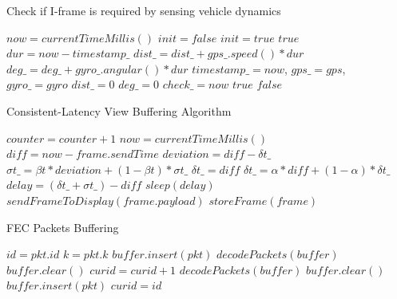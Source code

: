 
\begin{algorithm}[ht]
 \caption{Check if I-frame is required by sensing vehicle dynamics}
	\label{contextaware}
    \begin{algorithmic}[1]
  \State $now = currentTimeMillis()$
  \State $init = false$
    \State $init = true$
    \Return $true$
  \Else
    \State $dur = now - timestamp\_$
    \State $dist\_ = dist\_ + gps\_.speed() * dur$    
    \State $deg\_ = deg\_ + gyro\_.angular() * dur$
  \EndIf
  \State $timestamp\_ = now$, $gps\_ = gps$, $gyro\_ = gyro$
    \State $dist\_ = 0$
    \State $deg\_ = 0$
    \State $check\_ = now$
    \Return $true$
  \Else
    \Return $false$
  \EndIf
\EndFunction
\end{algorithmic}
\end{algorithm}




  \begin{algorithm}[ht]
   \caption{Consistent-Latency View Buffering Algorithm}
    \label{algorithm_clv}
    \begin{algorithmic}[1]
  \State $counter = counter + 1$
  \State $now = currentTimeMillis()$
  \State $diff = now - frame.sendTime$
    \State $deviation = diff - \delta{t}\_$
    \State $\sigma{t}\_ = \beta{t} * deviation + (1 - \beta{t}) * \sigma{t}\_$
  \EndIf
    \State $\delta{t}\_ = diff$
  \Else
    \State $\delta{t}\_ = \alpha * diff + (1 - \alpha) * \delta{t}\_$
  \EndIf
  \State $delay = (\delta{t}\_ + \sigma{t}\_) - diff$
    \State $sleep(delay)$
  \EndIf
  \State $sendFrameToDisplay(frame.payload)$
  \State $storeFrame(frame)$
\EndFunction
\end{algorithmic}
\end{algorithm}






  \begin{algorithm}[ht]
   \caption{FEC Packets Buffering}
    \label{fec_buffer}
    \begin{algorithmic}[1]
  \State ${id} = pkt.id$
  \State ${k} = pkt.k$
    \Return
  \EndIf
    \State $buffer.insert(pkt)$
      \State $decodePackets(buffer)$
      \State $buffer.clear()$
      \State $curid = curid + 1$
    \EndIf
  \Else
      \State $decodePackets(buffer)$
    \EndIf
    \State $buffer.clear()$
    \State $buffer.insert(pkt)$    
    \State $curid = id$
  \EndIf
\EndFunction
\end{algorithmic}
\end{algorithm}




